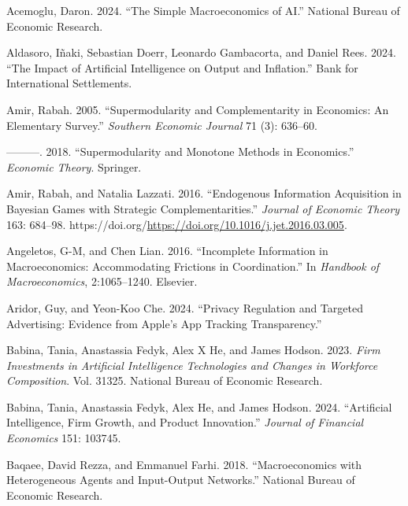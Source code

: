 \documentclass[
]{article}
\newlength{\cslhangindent}
\newenvironment{CSLReferences}[2] %
 {\begin{list}{}{%
  \setlength{\itemindent}{0pt}
  \setlength{\leftmargin}{0pt}
  \setlength{\parsep}{0pt}
  \ifodd #1
   \setlength{\leftmargin}{\cslhangindent}
   \setlength{\itemindent}{-1\cslhangindent}
  \fi
  \setlength{\itemsep}{#2\baselineskip}}}
 {\end{list}}
\theoremstyle{definition}
\theoremstyle{plain}
\theoremstyle{remark}
\begin{document}
\label{refs}
\begin{CSLReferences}{1}{0}
Acemoglu, Daron. 2024. {``The Simple Macroeconomics of AI.''} National
Bureau of Economic Research.

Aldasoro, Iñaki, Sebastian Doerr, Leonardo Gambacorta, and Daniel Rees.
2024. {``The Impact of Artificial Intelligence on Output and
Inflation.''} Bank for International Settlements.

Amir, Rabah. 2005. {``Supermodularity and Complementarity in Economics:
An Elementary Survey.''} \emph{Southern Economic Journal} 71 (3):
636--60.

---------. 2018. {``Supermodularity and Monotone Methods in
Economics.''} \emph{Economic Theory}. Springer.

Amir, Rabah, and Natalia Lazzati. 2016. {``Endogenous Information
Acquisition in Bayesian Games with Strategic Complementarities.''}
\emph{Journal of Economic Theory} 163: 684--98.
https://doi.org/\url{https://doi.org/10.1016/j.jet.2016.03.005}.

Angeletos, G-M, and Chen Lian. 2016. {``Incomplete Information in
Macroeconomics: Accommodating Frictions in Coordination.''} In
\emph{Handbook of Macroeconomics}, 2:1065--1240. Elsevier.

Aridor, Guy, and Yeon-Koo Che. 2024. {``Privacy Regulation and Targeted
Advertising: Evidence from Apple's App Tracking Transparency.''}

Babina, Tania, Anastassia Fedyk, Alex X He, and James Hodson. 2023.
\emph{Firm Investments in Artificial Intelligence Technologies and
Changes in Workforce Composition}. Vol. 31325. National Bureau of
Economic Research.

Babina, Tania, Anastassia Fedyk, Alex He, and James Hodson. 2024.
{``Artificial Intelligence, Firm Growth, and Product Innovation.''}
\emph{Journal of Financial Economics} 151: 103745.

Baqaee, David Rezza, and Emmanuel Farhi. 2018. {``Macroeconomics with
Heterogeneous Agents and Input-Output Networks.''} National Bureau of
Economic Research.


\end{CSLReferences}
\end{document}
